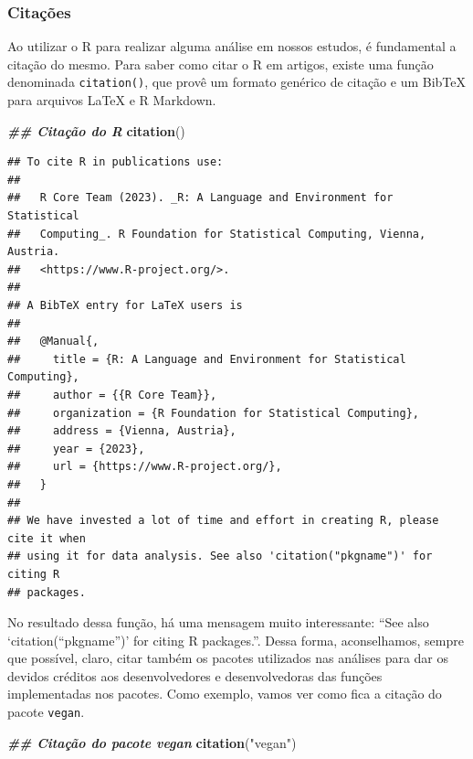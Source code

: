 \documentclass[
]{article}
\newenvironment{Shaded}{\begin{snugshade}}{\end{snugshade}}
\newcommand{\DocumentationTok}[1]{\textcolor[rgb]{0.56,0.35,0.01}{\textbf{\textit{#1}}}}
\newcommand{\FunctionTok}[1]{\textcolor[rgb]{0.13,0.29,0.53}{\textbf{#1}}}
\newcommand{\NormalTok}[1]{#1}
\newcommand{\StringTok}[1]{\textcolor[rgb]{0.31,0.60,0.02}{#1}}
\begin{document}
\hypertarget{citauxe7uxf5es}{%
\subsubsection{Citações}\label{citauxe7uxf5es}}

Ao utilizar o R para realizar alguma análise em nossos estudos, é fundamental a citação do mesmo. Para saber como citar o R em artigos, existe uma função denominada \texttt{citation()}, que provê um formato genérico de citação e um BibTeX para arquivos LaTeX e R Markdown.

\begin{Shaded}
\begin{Highlighting}[]
\DocumentationTok{\#\# Citação do R}
\FunctionTok{citation}\NormalTok{()}
\end{Highlighting}
\end{Shaded}

\begin{verbatim}
## To cite R in publications use:
## 
##   R Core Team (2023). _R: A Language and Environment for Statistical
##   Computing_. R Foundation for Statistical Computing, Vienna, Austria.
##   <https://www.R-project.org/>.
## 
## A BibTeX entry for LaTeX users is
## 
##   @Manual{,
##     title = {R: A Language and Environment for Statistical Computing},
##     author = {{R Core Team}},
##     organization = {R Foundation for Statistical Computing},
##     address = {Vienna, Austria},
##     year = {2023},
##     url = {https://www.R-project.org/},
##   }
## 
## We have invested a lot of time and effort in creating R, please cite it when
## using it for data analysis. See also 'citation("pkgname")' for citing R
## packages.
\end{verbatim}

No resultado dessa função, há uma mensagem muito interessante: ``See also `citation(``pkgname'')' for citing R packages.''. Dessa forma, aconselhamos, sempre que possível, claro, citar também os pacotes utilizados nas análises para dar os devidos créditos aos desenvolvedores e desenvolvedoras das funções implementadas nos pacotes. Como exemplo, vamos ver como fica a citação do pacote \texttt{vegan}.

\begin{Shaded}
\begin{Highlighting}[]
\DocumentationTok{\#\# Citação do pacote vegan}
\FunctionTok{citation}\NormalTok{(}\StringTok{"vegan"}\NormalTok{)}
\end{Highlighting}
\end{Shaded}
\end{document}
